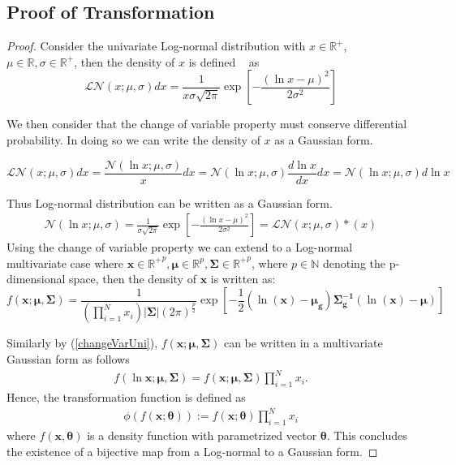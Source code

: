 \documentclass[11pt,letterpaper]{article}
\numberwithin{equation}{section}
\numberwithin{equation}{section}
\numberwithin{equation}{section}
\begin{document}
\subsection{Proof of Transformation}
\begin{proof}
Consider the univariate Log-normal distribution with $x \in \mathbb{R}^+$, $\mu \in \mathbb{R}, \sigma \in \mathbb{R}^+ $, then the density of $x$ is defined ~ as
$$\mathcal{LN}(x; \mu, \sigma)dx = \frac{1}{x\sigma\sqrt{2\pi}}\exp\left[-\frac{(\ln x - \mu)^2}{2\sigma^2}	\right]$$ 

We then consider that the change of variable property  must conserve differential probability. In doing so we can write the density of $x$  as a Gaussian form.

$$ \mathcal{LN}(x; \mu, \sigma)dx = \frac{\mathcal{N}(\ln x ; \mu, \sigma)}{x} dx = \mathcal{N}(\ln x; \mu, \sigma) \frac{d\ln x}{dx} dx = \mathcal{N}( \ln x; \mu, \sigma) d \ln x  $$

Thus Log-normal distribution can be written as a Gaussian form. 
\begin{align}
 \mathcal{N}(\ln x;\mu,\sigma) = \frac{1}{\sigma\sqrt{2\pi}} \exp\left[-\frac {(\ln x - \mu)^2} {2\sigma^2}\right] =  \mathcal{LN}(x; \mu, \sigma)*( x)  
\end{align}
Using the change of variable property we can extend to a Log-normal multivariate case where $\bm{x} \in \mathbb{R^{+}}^p , \bm{\mu} \in \mathbb{R}^p, \bm{\Sigma} \in  \mathbb{R^{+}}^p \label{changeVarUni} $, where $p \in \mathbb{N}$ denoting the p-dimensional space, then the density of $\bm{x}$ is written as: 
$$ f(\bm{x}; \bm{\mu } , \bm{\Sigma} )= \frac{1}{(\prod_{i=1}^{N}x_{i})| \bm{\Sigma} |(2 \pi)^{\frac{p}{2}}}   \exp\left[-\frac{1}{2}(\ln (\bm{x})-\bm{\mu_g})\bm{\Sigma_g^{-1}}(\ln (\bm{x})-\bm{\mu})\right]  $$

Similarly by (\ref{changeVarUni}), $f(\bm{x}; \bm{\mu } , \bm{\Sigma} )$ can be written in a multivariate Gaussian form as follows
\begin{align}
  f ( \ln \bm{x} ; \bm{ \mu} , \bm{\Sigma} )  =  f(\bm{x}; \bm{\mu } , \bm{\Sigma} ) \prod_{i=1}^{N}x_{i}  \label{changeVarMulti}  .
  \end{align}
  Hence, the transformation function is defined as 
  \begin{align}
 \phi \left( f(\bm{x}; \bm{\theta}) \right) :=  f(\bm{x}; \bm{\theta}) \prod_{i=1}^{N}x_{i}  \label{transformFunction} 
\end{align}  
where $ f(\bm{x}, \bm{\theta})$ is a density function with parametrized vector $\bm{\theta}$. This concludes the existence of a bijective map from a Log-normal to a Gaussian form. 

\end{proof}




\end{document}

